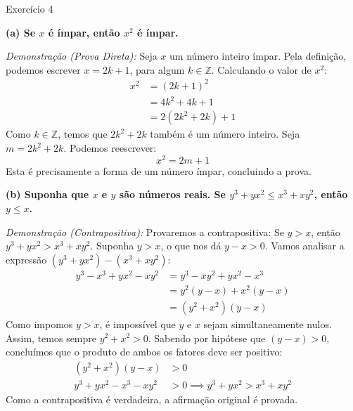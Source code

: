 \documentclass[a4paper,11pt]{article}
\theoremstyle{definition}
\theoremstyle{plain}
\theoremstyle{remark}
\newcounter{questao}[section]
\begin{document}
\newpage \begin{questaoManually}{Exercício 4}

\textbf{(a) Se $x$ é ímpar, então $x^2$ é ímpar.}

\textit{Demonstração (Prova Direta):}
Seja $x$ um número inteiro ímpar. Pela definição, podemos escrever $x = 2k + 1$, para algum $k \in \mathbb{Z}$.
Calculando o valor de $x^2$:
\begin{align*}
x^2 &= (2k + 1)^2 \\
&= 4k^2 + 4k + 1 \\
&= 2(2k^2 + 2k) + 1
\end{align*}
Como $k \in \mathbb{Z}$, temos que $2k^2 + 2k$ também é um número inteiro. Seja $m = 2k^2 + 2k$. Podemos reescrever:
\begin{equation}
x^2 = 2m + 1
\end{equation}
Esta é precisamente a forma de um número ímpar, concluindo a prova. \blacksquare

\textbf{(b) Suponha que $x$ e $y$ são números reais. Se $y^3 + yx^2 \le x^3 + xy^2$, então $y \le x$.}

\textit{Demonstração (Contrapositiva):}
Provaremos a contrapositiva: Se $y > x$, então $y^3 + yx^2 > x^3 + xy^2$.
Suponha $y > x$, o que nos dá $y - x > 0$.
Vamos analisar a expressão $(y^3 + yx^2) - (x^3 + xy^2)$:
\begin{align*}
y^3 - x^3 + yx^2 - xy^2 &= y^3 - xy^2 + yx^2 - x^3 \\
&= y^2(y - x) + x^2(y - x) \\
&= (y^2 + x^2)(y - x)
\end{align*}
Como impomos $y > x$, é impossível que $y$ e $x$ sejam simultaneamente nulos. Assim, temos sempre $y^2 + x^2 > 0$.
Sabendo por hipótese que $(y - x) > 0$, concluímos que o produto de ambos os fatores deve ser positivo:
\begin{align*}
(y^2 + x^2)(y - x) &> 0 \\
y^3 + yx^2 - x^3 - xy^2 &> 0 \implies y^3 + yx^2 > x^3 + xy^2
\end{align*}
Como a contrapositiva é verdadeira, a afirmação original é provada. \blacksquare

\end{questaoManually}
\end{document}

